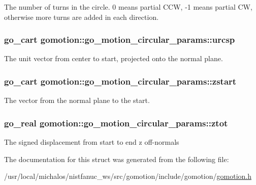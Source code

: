 The number of turns in the circle. 0 means partial C\-C\-W, -\/1 means partial C\-W, otherwise more turns are added in each direction. \hypertarget{structgomotion_1_1go__motion__circular__params_ab97f8ccebf3ca78e2be4a4adfe9c9e8c}{
\subsubsection[{urcsp}]{\setlength{\rightskip}{0pt plus 5cm}go\-\_\-cart gomotion\-::go\-\_\-motion\-\_\-circular\-\_\-params\-::urcsp}}\label{structgomotion_1_1go__motion__circular__params_ab97f8ccebf3ca78e2be4a4adfe9c9e8c}
The unit vector from center to start, projected onto the normal plane. \hypertarget{structgomotion_1_1go__motion__circular__params_a3638d197aac3d27862052befae408e94}{
\subsubsection[{zstart}]{\setlength{\rightskip}{0pt plus 5cm}go\-\_\-cart gomotion\-::go\-\_\-motion\-\_\-circular\-\_\-params\-::zstart}}\label{structgomotion_1_1go__motion__circular__params_a3638d197aac3d27862052befae408e94}
The vector from the normal plane to the start. \hypertarget{structgomotion_1_1go__motion__circular__params_a1572625c5322b3ace560429703948191}{
\subsubsection[{ztot}]{\setlength{\rightskip}{0pt plus 5cm}go\-\_\-real gomotion\-::go\-\_\-motion\-\_\-circular\-\_\-params\-::ztot}}\label{structgomotion_1_1go__motion__circular__params_a1572625c5322b3ace560429703948191}
The signed displacement from start to end z off-\/normals 

The documentation for this struct was generated from the following file\-:\begin{DoxyCompactItemize}
\item 
/usr/local/michalos/nistfanuc\-\_\-ws/src/gomotion/include/gomotion/\hyperlink{gomotion_8h}{gomotion.\-h}\end{DoxyCompactItemize}
